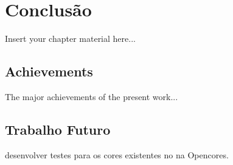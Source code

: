 
\chapter{Conclusão}
\label{chapter:conclusao}

Insert your chapter material here...


\section{Achievements}
\label{section:achievements}

The major achievements of the present work...


\section{Trabalho Futuro}
\label{section:futuro}

desenvolver testes para os cores existentes no na Opencores.


\cleardoublepage


